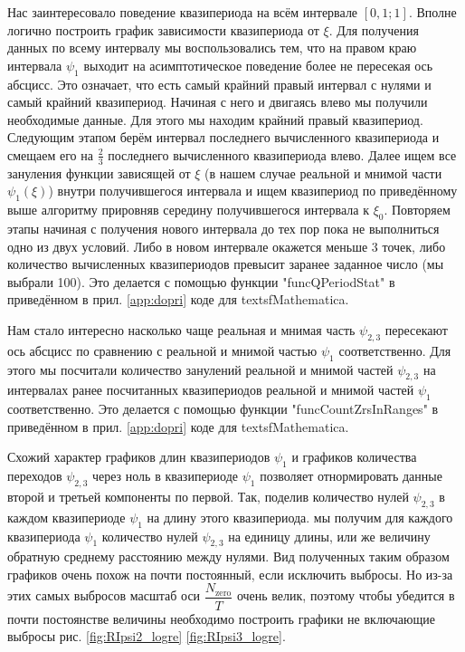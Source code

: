 \documentclass[a4paper,12pt]{article}
\begin{document}
	Нас заинтересовало поведение квазипериода на всём интервале \([0,1 ; 1]\). Вполне логично построить график зависимости квазипериода от \(\xi\). Для получения данных по всему интервалу мы воспользовались тем, что на правом краю интервала \(\psi_{1}\) выходит на асимптотическое поведение более не пересекая ось абсцисс. Это означает, что есть самый крайний правый интервал с нулями и самый крайний квазипериод. Начиная с него и двигаясь влево мы получили необходимые данные. Для этого мы находим крайний правый квазипериод. Следующим этапом берём интервал последнего вычисленного квазипериода и смещаем его на \(\frac{2}{3}\) последнего вычисленного квазипериода влево. Далее ищем все зануления функции зависящей от \(\xi\) (в нашем случае реальной и мнимой части \(\psi_1(\xi)\)) внутри получившегося интервала и ищем квазипериод по приведённому выше алгоритму прировняв середину получившегося интервала к \(\xi_0\). Повторяем этапы начиная с получения нового интервала до тех пор пока не выполниться одно из двух условий. Либо в новом интервале окажется меньше 3 точек, либо количество вычисленных квазипериодов превысит заранее заданное число (мы выбрали 100). Это делается с помощью функции "funcQPeriodStat" в приведённом в прил. \eqref{app:dopri} коде для textsf{Mathematica}.

	Нам стало интересно насколько чаще реальная и мнимая часть \(\psi_{2,3}\) пересекают ось абсцисс по сравнению с реальной и мнимой частью \(\psi_1\) соответственно. Для этого мы посчитали количество занулений реальной и мнимой частей \(\psi_{2,3}\) на интервалах ранее посчитанных квазипериодов реальной и мнимой частей \(\psi_1\) соответственно. Это делается с помощью функции "funcCountZrsInRanges" в приведённом в прил. \eqref{app:dopri} коде для textsf{Mathematica}.
	
		Схожий характер графиков длин квазипериодов \(\psi_1\) и графиков количества переходов \(\psi_{2,3}\) через ноль в квазипериоде \(\psi_1\) позволяет отнормировать данные второй и третьей компоненты по первой. Так, поделив количество нулей \(\psi_{2,3}\) в каждом квазипериоде \(\psi_1\) на длину этого квазипериода. мы получим для каждого квазипериода \(\psi_1\) количество нулей \(\psi_{2,3}\) на единицу длины, или же величину обратную среднему расстоянию между нулями. Вид полученных таким образом графиков очень похож на почти постоянный, если исключить выбросы. Но из-за этих самых выбросов масштаб оси \(\dfrac{N_{\text{zero}}}{T}\) очень велик, поэтому чтобы убедится в почти постоянстве величины необходимо построить графики не включающие выбросы рис. \eqref{fig:RIpsi2_logre}  \eqref{fig:RIpsi3_logre}.
		
\end{document}
